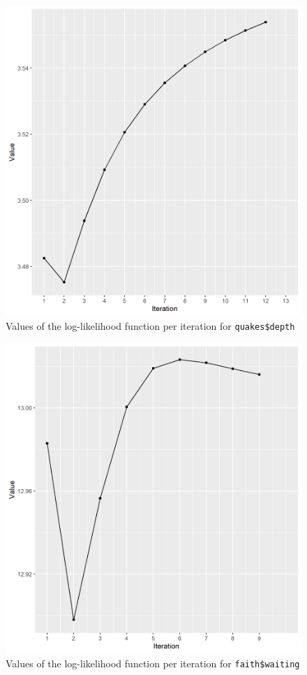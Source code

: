 \begin{figure}[h]
\centering
\includegraphics[scale=0.75, keepaspectratio]{ex5/5quakes_depth_iter.png}
\caption{Values of the log-likelihood function per iteration for \texttt{quakes\$depth}}
\label{5quakes_depth_iter}
\end{figure} 


\begin{figure}[h]
\centering
\includegraphics[scale=0.75, keepaspectratio]{ex5/5faith_wait_iter.png}
\caption{Values of the log-likelihood function per iteration for  \texttt{faith\$waiting}}
\label{5faith_wait_iter}
\end{figure}

